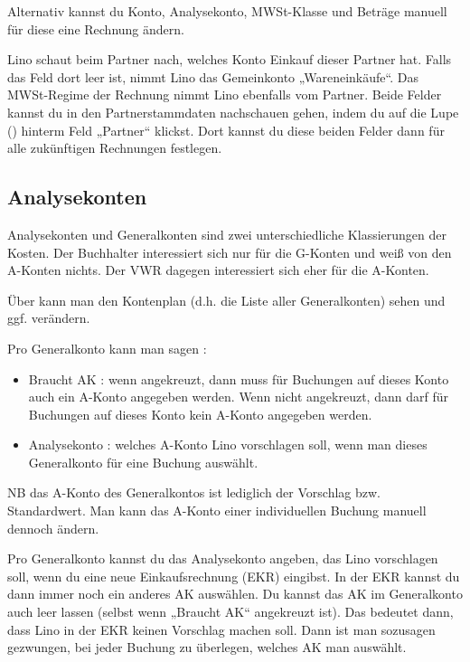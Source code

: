 \documentclass[letterpaper,10pt,ngerman]{sphinxmanual}
\begin{document}
Alternativ kannst du Konto, Analysekonto, MWSt-Klasse und Beträge
manuell für diese eine Rechnung ändern.

Lino schaut beim Partner nach, welches Konto Einkauf dieser Partner
hat. Falls das Feld dort leer ist, nimmt Lino das Gemeinkonto
„Wareneinkäufe“. Das MWSt-Regime der Rechnung nimmt Lino ebenfalls vom
Partner. Beide Felder kannst du in den Partnerstammdaten nachschauen
gehen, indem du auf die Lupe () hinterm Feld „Partner“
klickst. Dort kannst du diese beiden Felder dann für alle zukünftigen
Rechnungen festlegen.


\subsection{Analysekonten}
\label{\detokenize{sek/ledger:analysekonten}}
Analysekonten und Generalkonten sind zwei unterschiedliche
Klassierungen der Kosten. Der Buchhalter interessiert sich nur für die
G-Konten und weiß von den A-Konten nichts. Der VWR dagegen
interessiert sich eher für die A-Konten.

Über  kann
man den Kontenplan (d.h. die Liste aller Generalkonten) sehen und
ggf. verändern.

Pro Generalkonto kann man sagen :
\begin{itemize}
\item {} 
Braucht AK : wenn angekreuzt, dann muss für Buchungen auf dieses
Konto auch ein A-Konto angegeben werden. Wenn nicht angekreuzt, dann
darf für Buchungen auf dieses Konto kein A-Konto angegeben werden.

\item {} 
Analysekonto : welches A-Konto Lino vorschlagen soll, wenn man
dieses Generalkonto für eine Buchung auswählt.

\end{itemize}

NB das A-Konto des Generalkontos ist lediglich der Vorschlag
bzw. Standardwert. Man kann das A-Konto einer individuellen Buchung
manuell dennoch ändern.

Pro Generalkonto kannst du das Analysekonto angeben, das Lino
vorschlagen soll, wenn du eine neue Einkaufsrechnung (EKR)
eingibst. In der EKR kannst du dann immer noch ein anderes AK
auswählen. Du kannst das AK im Generalkonto auch leer lassen (selbst
wenn „Braucht AK“ angekreuzt ist). Das bedeutet dann, dass Lino in der
EKR keinen Vorschlag machen soll. Dann ist man sozusagen gezwungen,
bei jeder Buchung zu überlegen, welches AK man auswählt.
\end{document}
